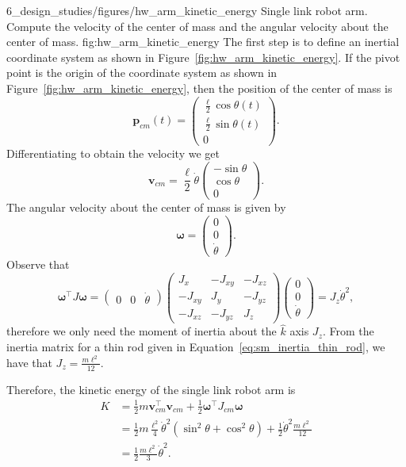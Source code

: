 
	{6_design_studies/figures/hw_arm_kinetic_energy} 
	{Single link robot arm.  Compute the velocity of the center of mass and the angular velocity about the center of mass.}
	{fig:hw_arm_kinetic_energy}
The first step is to define an inertial coordinate system as shown in Figure~\ref{fig:hw_arm_kinetic_energy}.  If the pivot point is the origin of the coordinate system as shown in Figure~\ref{fig:hw_arm_kinetic_energy}, then the position of the center of mass is 
\[
\mathbf{p}_{cm}(t) = \begin{pmatrix} \frac{\ell}{2}\cos\theta(t) \\ \frac{\ell}{2}\sin\theta(t) \\ 0 \end{pmatrix}.
\]
Differentiating to obtain the velocity we get
\[
\mathbf{v}_{cm} = \frac{\ell}{2}\dot{\theta} \begin{pmatrix} -\sin\theta \\ \cos\theta \\ 0 \end{pmatrix}.
\]
The angular velocity about the center of mass is given by
\[
\boldsymbol{\omega} = \begin{pmatrix} 0 \\ 0 \\ \dot{\theta} \end{pmatrix}.
\]
Observe that 
\[
\boldsymbol{\omega}^\top J \boldsymbol{\omega} = \begin{pmatrix} 0 & 0 & \dot{\theta}\end{pmatrix} 
\begin{pmatrix} J_x & -J_{xy} & -J_{xz} \\ -J_{xy} & J_y & -J_{yz} \\ -J_{xz} & -J_{yz} & J_z \end{pmatrix} 
\begin{pmatrix} 0 \\ 0 \\ \dot{\theta} \end{pmatrix} = J_z \dot{\theta}^2,
\]
therefore we only need the moment of inertia about the $\hat{k}$ axis $J_z$. From the inertia matrix for a thin rod given in Equation~\eqref{eq:sm_inertia_thin_rod}, we have that $J_z=\frac{m\ell^2}{12}$.

Therefore, the kinetic energy of the single link robot arm is 
\begin{align*}
K &= \frac{1}{2} m \mathbf{v}_{cm}^\top \mathbf{v}_{cm} + \frac{1}{2}\boldsymbol{\omega}^\top J_{cm} \boldsymbol{\omega} \\
  &= \frac{1}{2} m \frac{\ell^2}{4}\dot{\theta}^2(\sin^2\theta + \cos^2\theta) + \frac{1}{2}\dot{\theta}^2\frac{m\ell^2}{12} \\
  &=\frac{1}{2}\frac{m\ell^2}{3}\dot{\theta}^2.
\end{align*}

